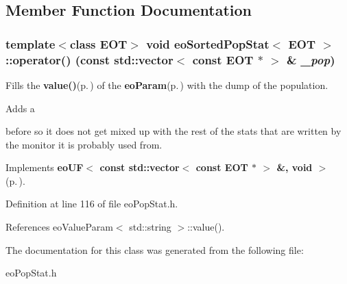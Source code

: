 \subsection{Member Function Documentation}
\subsubsection{\setlength{\rightskip}{0pt plus 5cm}template$<$class EOT$>$ void {\bf eo\-Sorted\-Pop\-Stat}$<$ {\bf EOT} $>$::operator() (const std::vector$<$ const {\bf EOT} $\ast$ $>$ \& {\em \_\-pop})\hspace{0.3cm}{\tt  [inline, virtual]}}\label{classeo_sorted_pop_stat_a1}


Fills the {\bf value()}{\rm (p.\,\pageref{classeo_value_param_a2})} of the {\bf eo\-Param}{\rm (p.\,\pageref{classeo_param})} with the dump of the population. 

Adds a \par
 before so it does not get mixed up with the rest of the stats that are written by the monitor it is probably used from. 

Implements {\bf eo\-UF$<$ const std::vector$<$ const EOT $\ast$ $>$ \&, void $>$} {\rm (p.\,\pageref{classeo_u_f_a1})}.

Definition at line 116 of file eo\-Pop\-Stat.h.

References eo\-Value\-Param$<$ std::string $>$::value().

The documentation for this class was generated from the following file:\begin{CompactItemize}
\item 
eo\-Pop\-Stat.h\end{CompactItemize}
